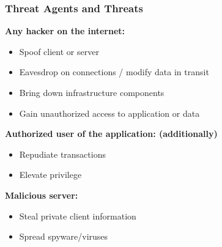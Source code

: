 \columnbreak
\subsubsection{Threat Agents and Threats}
\textbf{Any hacker on the internet:}
\begin{itemize}
    \item Spoof client or server
    \item Eavesdrop on connections / modify data in transit
    \item Bring down infrastructure components
    \item Gain unauthorized access to application or data
\end{itemize}
\textbf{Authorized user of the application: (additionally)}
\begin{itemize}
    \item Repudiate transactions
    \item Elevate privilege
\end{itemize}
\textbf{Malicious server:}
\begin{itemize}
    \item Steal private client information
    \item Spread spyware/viruses
\end{itemize}

